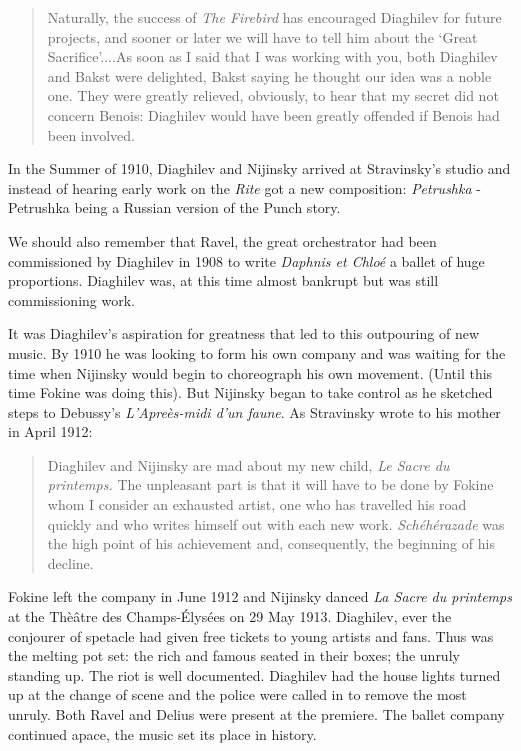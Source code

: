 \begin{quotation}
Naturally, the success of \textit{The Firebird} has encouraged Diaghilev for future projects, and sooner or later we will have to tell him about the `Great Sacrifice'....As soon as I said that I was working with you, both Diaghilev and Bakst were delighted, Bakst saying he thought our idea was a noble one. They were greatly relieved, obviously, to hear that my secret did not concern Benois: Diaghilev would have been greatly offended if Benois had been involved. \citep[p176]{buckle1975diaghilev}
\end{quotation}

In the Summer of 1910, Diaghilev and Nijinsky arrived at Stravinsky's studio and instead of hearing early work on the \textit{Rite} got a new composition: \textit{Petrushka} - Petrushka being a Russian version of the Punch story. 

We should also remember that Ravel, the great orchestrator had been commissioned by Diaghilev in 1908 to write \textit{Daphnis et Chlo\'e} a ballet of huge proportions. Diaghilev was, at this time almost bankrupt but was still commissioning work. 

It was Diaghilev's aspiration for greatness that led to this outpouring of new music. By 1910 he was looking to form his own company and was waiting for the time when Nijinsky would begin to choreograph his own movement. (Until this time Fokine was doing this). But Nijinsky began to take control as he sketched steps to Debussy's \textit{L'Apre\`es-midi d'un faune}. As Stravinsky wrote to his mother in April 1912:

\begin{quotation}
Diaghilev and Nijinsky are mad about my new child, \textit{Le Sacre du printemps.} The unpleasant part is that it will have to be done by Fokine whom I consider an exhausted artist, one who has travelled his road quickly and who writes himself out with each new work. \textit{Sch\'eh\'erazade} was the high point of his achievement and, consequently, the beginning of his decline. \citep[p219]{buckle1975diaghilev}
\end{quotation}

Fokine left the company in June 1912 and Nijinsky danced \textit{La Sacre du printemps} at the Th\`e\^atre des Champs-\'Elys\'ees on 29 May 1913. Diaghilev, ever the conjourer of spetacle had given free tickets to young artists and fans. Thus was the melting pot set: the rich and famous seated in their boxes; the unruly standing up. The riot is well documented. Diaghilev had the house lights turned up at the change of scene and the police were called in to remove the most unruly. Both Ravel and Delius were present at the premiere. The ballet company continued apace, the music set its place in history. 

